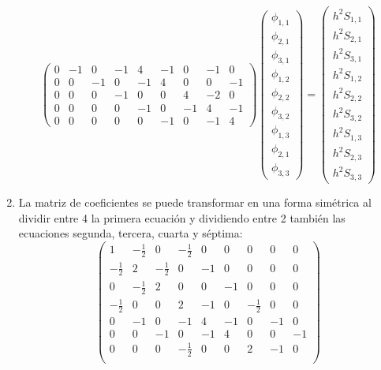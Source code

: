 \documentclass[12pt]{article}
\numberwithin{equation}{section}
\begin{document}
\begin{enumerate}
\begin{equation*}
\begin{pmatrix}
		0 & -1 & 0 & -1 & 4 & -1 & 0 & -1 & 0 \\
		0 & 0 & -1 & 0 & -1 & 4 & 0 & 0 & -1 \\
		0 & 0 & 0 & -1 & 0  & 0 & 4 & -2 & 0 \\
		0 & 0 & 0 & 0 & -1 & 0 & -1 & 4 & -1 \\
		0 & 0 & 0 & 0 & 0 & -1 & 0 & -1 & 4 	
	\end{pmatrix}
	\begin{pmatrix}
		\phi_{1,1} \\
		\phi_{2,1} \\
		\phi_{3,1} \\
		\phi_{1,2} \\
		\phi_{2,2} \\
		\phi_{3,2} \\
		\phi_{1,3} \\
		\phi_{2,1} \\
		\phi_{3,3} 
	\end{pmatrix}
		=
	\begin{pmatrix}
		h^{2} S_{1,1} \\
		h^{2} S_{2,1} \\
		h^{2} S_{3,1} \\
		h^{2} S_{1,2} \\
		h^{2} S_{2,2} \\
		h^{2} S_{3,2} \\
		h^{2} S_{1,3} \\
		h^{2} S_{2,3} \\
		h^{2} S_{3,3}
	\end{pmatrix}
\end{equation*}
\item La matriz de coeficientes se puede transformar en una forma simétrica al dividir entre 4 la primera ecuación  y dividiendo entre 2 también las ecuaciones segunda, tercera, cuarta y séptima:
\begin{equation*}
	\begin{pmatrix}
	1 & - \frac{1}{2} & 0 & - \frac{1}{2} & 0 & 0 & 0 & 0 & 0 \\
	- \frac{1}{2} & 2 & - \frac{1}{2} & 0 & -1 & 0 & 0 & 0 & 0 \\
	0 & -\frac{1}{2} & 2 & 0 & 0 & -1 & 0 & 0 & 0 \\
	- \frac{1}{2} & 0 & 0 & 2 & -1 & 0 & - \frac{1}{2} & 0 & 0 \\
	0 & -1 & 0 & -1 & 4 & -1 & 0 & -1 & 0 \\
	0 & 0 & -1 & 0 & -1 & 4 & 0 & 0 & -1 \\
	0 & 0 & 0 & - \frac{1}{2} & 0 & 0 & 2 & -1 & 0 \\

\end{pmatrix}
\end{equation*}
\end{enumerate}
\end{document}

